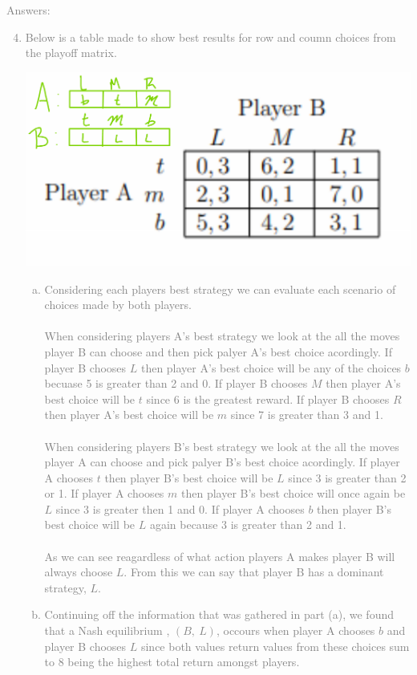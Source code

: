 \documentclass[11pt]{article}
\begin{document}
\textcolor{gray}{
Answers:
\begin{enumerate}
	\setcounter{enumi}{3}
	\item  Below is a table made to show best results for row and coumn choices from the playoff matrix.
	\begin{center}
		\includegraphics[scale=0.65]{Figure1.5}
	\end{center}
	\begin{enumerate}[(a)]
		\item Considering each players best strategy we can evaluate each scenario of choices made by both players.\\\\
		When considering players A's best strategy we look at the all the moves player B can choose and then pick palyer A's best choice acordingly. If player B chooses $L$ then player A's best choice will be any of the choices $b$ becuase 5 is greater than 2 and 0. If player B chooses $M$ then player A's best choice will be $t$ since 6 is the greatest reward. If player B chooses $R$ then player A's best choice will be $m$ since 7 is greater than 3 and 1.\\\\
		When considering players B's best strategy we look at the all the moves player A can choose and pick palyer B's best choice acordingly.  If player A chooses $t$ then player B's best choice will be $L$ since 3 is greater than 2 or 1. If player A chooses $m$ then player B's best choice will once again be $L$ since 3 is greater then 1 and 0. If player A chooses $b$ then player B's best choice will be $L$ again because 3 is greater than 2 and 1.\\\\
As we can see reagardless of what action players A makes player B will always choose $L$.  From this we can say that player B has a dominant strategy, $L$.
		\item Continuing off the information that was gathered in part (a), we found that a Nash equilibrium , $(B, \ L)$, occours when player A chooses $b$ and player B chooses $L$ since both values return values from these choices sum to 8 being the highest total return amongst players.
	\end{enumerate}
\end{enumerate}
}
\end{document}
